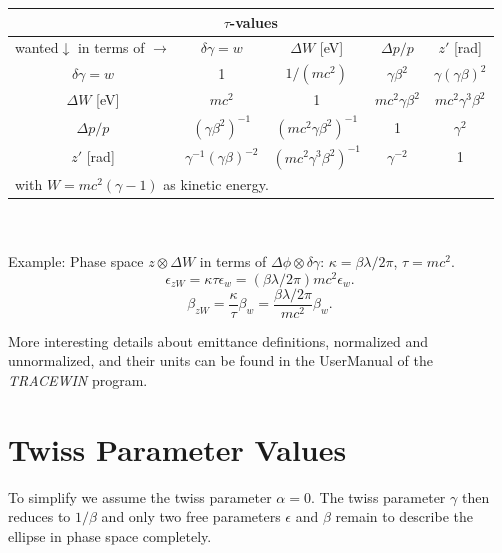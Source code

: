 \documentclass{article}
\begin{document}
\begin{tabular}{|c|c|c|c|c|}
\hline
\multicolumn{5}{|c|}{\textbf{$\tau$-values}} \\
\hline
wanted$\downarrow$ in terms of
$\rightarrow$                  &$\delta\gamma = w$              &$\Delta W$ [eV]              &$\Delta p/p$        &$z'$ [rad]    \\
\hline
$\delta\gamma = w$             &1                               &$1/(mc^2)$                   &$\gamma\beta^2$     &$\gamma(\gamma\beta)^2$ \\ 
$\Delta W$ [eV]                &$mc^2$                          &1                            &$mc^2\gamma\beta^2$ &$mc^2\gamma^3\beta^2$ \\
$\Delta p/p$                   &$(\gamma\beta^2)^{-1}$          &$(mc^2\gamma\beta^2)^{-1}$   &1                   &$\gamma^2$ \\
$z'$ [rad]                     &$\gamma^{-1}(\gamma\beta)^{-2}$ &$(mc^2\gamma^3\beta^2)^{-1}$ &$\gamma^{-2}$       &1  \\
\hline
\multicolumn{5}{|l|}{with $W = mc^2 (\gamma-1)$ as kinetic energy.} \\
\hline
\end{tabular} \\ \\

Example: Phase space $z\otimes\Delta W$ in terms of $\Delta\phi\otimes\delta\gamma$: $\kappa = \beta\lambda/2\pi$, $\tau = mc^2$.
\begin{equation}
\epsilon_{zW} = \kappa\tau\epsilon_w=(\beta\lambda/2\pi) mc^2\epsilon_w.
\end{equation}
\begin{equation}
\beta_{zW} = \frac{\kappa}{\tau}\beta_w=\frac{\beta\lambda/2\pi}{mc^2}\beta_w.
\end{equation}

More interesting details about emittance definitions, normalized and unnormalized, and their units can be found in the UserManual of the \emph{TRACEWIN} program.

\section{Twiss Parameter Values}
To simplify we assume the twiss parameter $ \alpha = 0 $. The twiss  parameter $ \gamma $ then reduces to $ 1/{\beta} $
and only two free parameters $ \epsilon $ and $ \beta $ remain to describe the ellipse in phase space completely.
\end{document}
